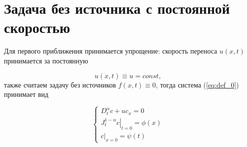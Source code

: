\section{Задача без источника с постоянной скоростью}

Для первого приближения принимается упрощение: скорость переноса $u(x,t)$ принимается за постоянную

\begin{equation}
	u(x,t) \equiv u = const,
\end{equation}
также считаем задачу без источников $f(x,t)\equiv0$, тогда система (\ref{eq:def_0}) принимает вид

\begin{equation}
	\label{eq:an_0}
	\begin{cases}
		D^\alpha_t c + uc_x = 0\\
		\left.J^{1-\alpha}_tc\right|_{t=0} = \phi(x)\\
		\left.c\right|_{x=0}=\psi(t)
	\end{cases}
\end{equation}


